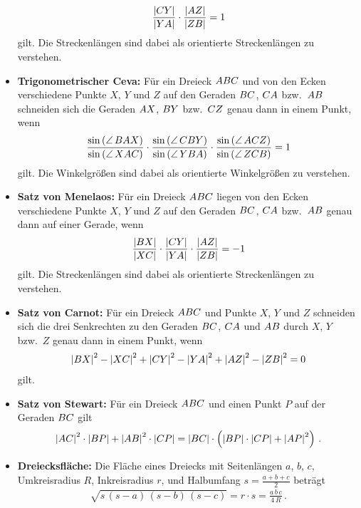 \documentclass[11pt,a4paper]{article}
\begin{document}
\begin{itemize}
\begin{gather*}
    \frac{\left\vert {\mathnormal{CY}}\right\vert}{\left\vert {\mathnormal{YA}}\right\vert}\cdot
    \frac{\left\vert {\mathnormal{AZ}}\right\vert}{\left\vert {\mathnormal{ZB}}\right\vert}=1
  \end{gather*}
  gilt.  Die Streckenlängen sind dabei als orientierte Streckenlängen zu
  verstehen. 
\item \textbf{Trigonometrischer Ceva:} Für ein Dreieck $\ktriangle*{ABC}$ und
  von den Ecken verschiedene Punkte $X$, $Y$ und $Z$ auf den Geraden
  ${\mathnormal{BC}}$, ${\mathnormal{CA}}$ bzw.\ ${\mathnormal{AB}}$ schneiden sich die Geraden
  ${\mathnormal{AX}}$, ${\mathnormal{BY}}$ bzw.\ ${\mathnormal{CZ}}$ genau dann in einem Punkt,
  wenn 
  \begin{gather*}
    \frac{\sin\br{\kangle{BAX}}}{\sin\br{\kangle{XAC}}}\cdot
    \frac{\sin\br{\kangle{CBY}}}{\sin\br{\kangle{YBA}}}\cdot
    \frac{\sin\br{\kangle{ACZ}}}{\sin\br{\kangle{ZCB}}}=1
  \end{gather*}
  gilt. Die Winkelgrößen sind dabei als orientierte Winkelgrößen zu verstehen.
\item \textbf{Satz von Menelaos:} Für ein Dreieck $\ktriangle*{ABC}$ liegen
  von den Ecken verschiedene Punkte $X$, $Y$ und $Z$ auf den Geraden
  ${\mathnormal{BC}}$, ${\mathnormal{CA}}$ bzw.\ ${\mathnormal{AB}}$ genau dann auf einer Gerade,
  wenn 
  \begin{gather*}
    \frac{\left\vert {\mathnormal{BX}}\right\vert}{\left\vert {\mathnormal{XC}}\right\vert}\cdot
    \frac{\left\vert {\mathnormal{CY}}\right\vert}{\left\vert {\mathnormal{YA}}\right\vert}\cdot
    \frac{\left\vert {\mathnormal{AZ}}\right\vert}{\left\vert {\mathnormal{ZB}}\right\vert}=-1
  \end{gather*}
  gilt.  Die Streckenlängen sind dabei als orientierte Streckenlängen zu
  verstehen. 
\item \textbf{Satz von Carnot:} Für ein Dreieck $\ktriangle*{ABC}$ und Punkte
  $X$, $Y$ und $Z$ schneiden sich die drei Senkrechten zu den Geraden
  ${\mathnormal{BC}}$, ${\mathnormal{CA}}$ und ${\mathnormal{AB}}$ durch $X$, $Y$ bzw.\ $Z$ genau
  dann in einem Punkt, wenn 
  \begin{gather*}
    \left\vert {\mathnormal{BX}}\right\vert^{2}-\left\vert {\mathnormal{XC}}\right\vert^{2} +\left\vert {\mathnormal{CY}}\right\vert^{2}-\left\vert {\mathnormal{YA}}\right\vert^{2}
    +\left\vert {\mathnormal{AZ}}\right\vert^{2}-\left\vert {\mathnormal{ZB}}\right\vert^{2}=0
  \end{gather*}
  gilt.
\item \textbf{Satz von Stewart:} Für ein Dreieck $\ktriangle*{ABC}$ und einen
  Punkt $P$ auf der Geraden ${\mathnormal{BC}}$ gilt 
  \begin{gather*}
    \left\vert {\mathnormal{AC}}\right\vert^{2}\cdot \left\vert {\mathnormal{BP}}\right\vert +\left\vert {\mathnormal{AB}}\right\vert^{2}\cdot \left\vert {\mathnormal{CP}}\right\vert
    =\left\vert {\mathnormal{BC}}\right\vert\cdot\left(\left\vert {\mathnormal{BP}}\right\vert\cdot
      \left\vert {\mathnormal{CP}}\right\vert+\left\vert {\mathnormal{AP}}\right\vert^{2}\right)\,.
  \end{gather*}
\item \textbf{Dreiecksfläche:} Die Fläche eines Dreiecks mit Seitenlängen $a$,
  $b$, $c$, Umkreisradius $R$, Inkreisradius $r$, und Halbumfang
  $s=\frac{a+b+c}{2}$ beträgt 
  \begin{gather*}
    \sqrt{s\,(s-a)\,(s-b)\,(s-c)}=r\cdot s=\frac{a\,b\,c}{4\,R}\,.
  \end{gather*}
\end{itemize}
\end{document}
